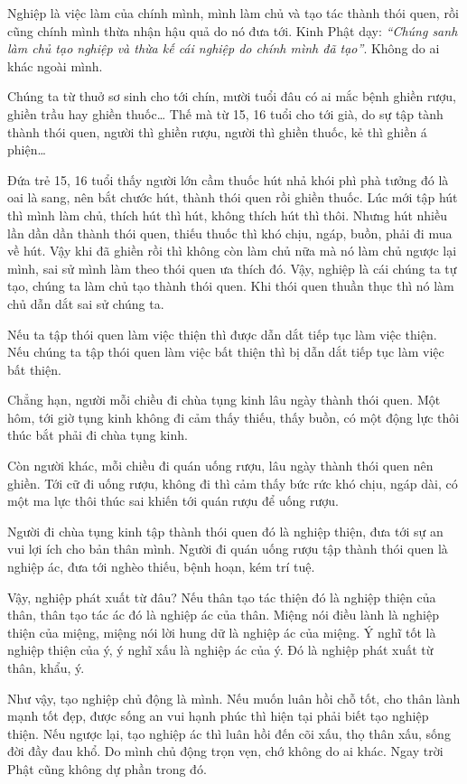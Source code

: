 \documentclass[
  12pt,
  oneside]{book}
\begin{document}
Nghiệp là việc làm của chính mình, mình làm chủ và tạo tác thành thói quen, rồi cũng chính mình thừa nhận hậu quả do nó đưa tới. Kinh Phật dạy: \emph{``Chúng sanh làm chủ tạo nghiệp và thừa kế cái nghiệp do chính mình đã tạo''}. Không do ai khác ngoài mình.

Chúng ta từ thuở sơ sinh cho tới chín, mười tuổi đâu có ai mắc bệnh ghiền rượu, ghiền trầu hay ghiền thuốc\ldots{} Thế mà từ 15, 16 tuổi cho tới già, do sự tập tành thành thói quen, người thì ghiền rượu, người thì ghiền thuốc, kẻ thì ghiền á phiện\ldots{}

Đứa trẻ 15, 16 tuổi thấy người lớn cầm thuốc hút nhả khói phì phà tưởng đó là oai là sang, nên bắt chước hút, thành thói quen rồi ghiền thuốc. Lúc mới tập hút thì mình làm chủ, thích hút thì hút, không thích hút thì thôi. Nhưng hút nhiều lần dần dần thành thói quen, thiếu thuốc thì khó chịu, ngáp, buồn, phải đi mua về hút. Vậy khi đã ghiền rồi thì không còn làm chủ nữa mà nó làm chủ ngược lại mình, sai sử mình làm theo thói quen ưa thích đó. Vậy, nghiệp là cái chúng ta tự tạo, chúng ta làm chủ tạo thành thói quen. Khi thói quen thuần thục thì nó làm chủ dẫn dắt sai sử chúng ta.

Nếu ta tập thói quen làm việc thiện thì được dẫn dắt tiếp tục làm việc thiện. Nếu chúng ta tập thói quen làm việc bất thiện thì bị dẫn dắt tiếp tục làm việc bất thiện.

Chẳng hạn, người mỗi chiều đi chùa tụng kinh lâu ngày thành thói quen. Một hôm, tới giờ tụng kinh không đi cảm thấy thiếu, thấy buồn, có một động lực thôi thúc bắt phải đi chùa tụng kinh.

Còn người khác, mỗi chiều đi quán uống rượu, lâu ngày thành thói quen nên ghiền. Tới cữ đi uống rượu, không đi thì cảm thấy bức rức khó chịu, ngáp dài, có một ma lực thôi thúc sai khiến tới quán rượu để uống rượu.

Người đi chùa tụng kinh tập thành thói quen đó là nghiệp thiện, đưa tới sự an vui lợi ích cho bản thân mình. Người đi quán uống rượu tập thành thói quen là nghiệp ác, đưa tới nghèo thiếu, bệnh hoạn, kém trí tuệ.

Vậy, nghiệp phát xuất từ đâu? Nếu thân tạo tác thiện đó là nghiệp thiện của thân, thân tạo tác ác đó là nghiệp ác của thân. Miệng nói điều lành là nghiệp thiện của miệng, miệng nói lời hung dữ là nghiệp ác của miệng. Ý nghĩ tốt là nghiệp thiện của ý, ý nghĩ xấu là nghiệp ác của ý. Đó là nghiệp phát xuất từ thân, khẩu, ý.

Như vậy, tạo nghiệp chủ động là mình. Nếu muốn luân hồi chỗ tốt, cho thân lành mạnh tốt đẹp, được sống an vui hạnh phúc thì hiện tại phải biết tạo nghiệp thiện. Nếu ngược lại, tạo nghiệp ác thì luân hồi đến cõi xấu, thọ thân xấu, sống đời đầy đau khổ. Do mình chủ động trọn vẹn, chớ không do ai khác. Ngay trời Phật cũng không dự phần trong đó.
\end{document}

